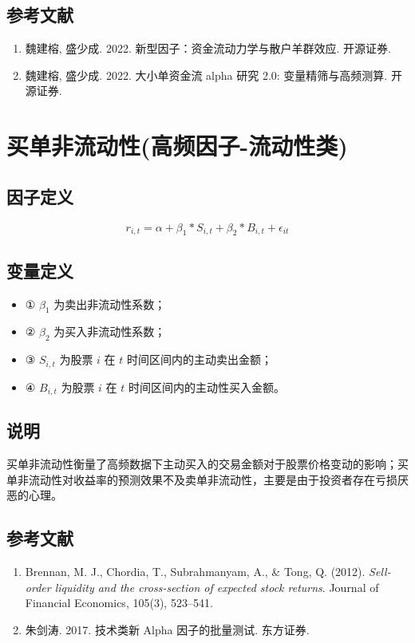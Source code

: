 \documentclass{article}
\begin{document}
\subsection{参考文献}
\begin{enumerate}
    \item 魏建榕, 盛少成. 2022. 新型因子：资金流动力学与散户羊群效应. 开源证券.
    \item 魏建榕, 盛少成. 2022. 大小单资金流 alpha 研究 2.0: 变量精筛与高频测算. 开源证券.
\end{enumerate}

\section{买单非流动性(高频因子-流动性类)}

\subsection{因子定义}
\begin{equation}
    r_{i,t} = \alpha + \beta_1 * S_{i,t} + \beta_2 * B_{i,t} + \epsilon_{it}
\end{equation}

\subsection{变量定义}
\begin{itemize}
    \item ① \( \beta_1 \) 为卖出非流动性系数；
    \item ② \( \beta_2 \) 为买入非流动性系数；
    \item ③ \( S_{i,t} \) 为股票 \( i \) 在 \( t \) 时间区间内的主动卖出金额；
    \item ④ \( B_{i,t} \) 为股票 \( i \) 在 \( t \) 时间区间内的主动性买入金额。
\end{itemize}

\subsection{说明}
买单非流动性衡量了高频数据下主动买入的交易金额对于股票价格变动的影响；买单非流动性对收益率的预测效果不及卖单非流动性，主要是由于投资者存在亏损厌恶的心理。

\subsection{参考文献}
\begin{enumerate}
    \item Brennan, M. J., Chordia, T., Subrahmanyam, A., \& Tong, Q. (2012). \textit{Sell-order liquidity and the cross-section of expected stock returns}. Journal of Financial Economics, 105(3), 523–541.
    \item 朱剑涛. 2017. 技术类新 Alpha 因子的批量测试. 东方证券.
\end{enumerate}
\end{document}
